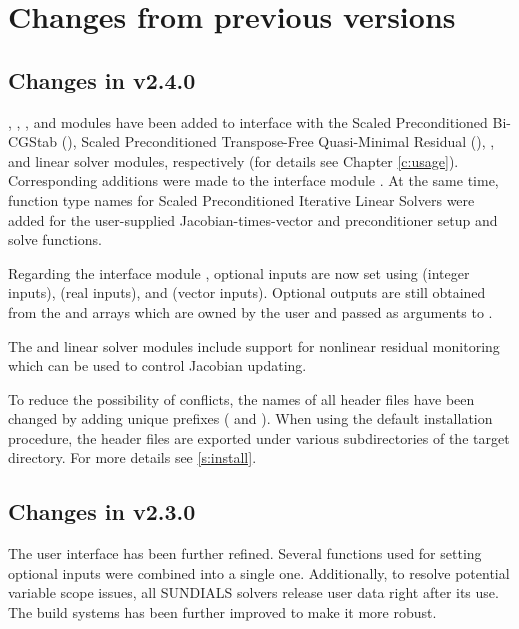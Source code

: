 \section{Changes from previous versions}

\subsection*{Changes in v2.4.0}

{\kinspbcg}, {\kinsptfqmr}, {\kindense}, and {\kinband} modules have been
added to interface with the Scaled Preconditioned Bi-CGStab ({\spbcg}),
Scaled Preconditioned Transpose-Free Quasi-Minimal Residual ({\sptfqmr}),
{\dense}, and {\band} linear solver modules, respectively (for details
see Chapter \ref{c:usage}). Corresponding additions were made to the {\F}
interface module {\fkinsol}. At the same time, function type names for
Scaled Preconditioned Iterative Linear Solvers were added for the
user-supplied Jacobian-times-vector and preconditioner setup and solve
functions.

Regarding the {\F} interface module {\fkinsol}, optional inputs are now
set using  (integer inputs),  (real inputs),
and  (vector inputs). Optional outputs are still obtained
from the  and  arrays which are owned by the user
and passed as arguments to .

The {\kindense} and {\kinband} linear solver modules include support for
nonlinear residual monitoring which can be used to control Jacobian
updating.

To reduce the possibility of conflicts, the names of all header files have
been changed by adding unique prefixes ( and ).
When using the default installation procedure, the header files are exported
under various subdirectories of the target  directory. For more
details see \s\ref{s:install}.

\subsection*{Changes in v2.3.0}

The user interface has been further refined. Several functions used for setting optional
inputs were combined into a single one. Additionally, to resolve potential variable scope
issues, all SUNDIALS solvers release user data right after its use. The build systems has 
been further improved to make it more robust.

